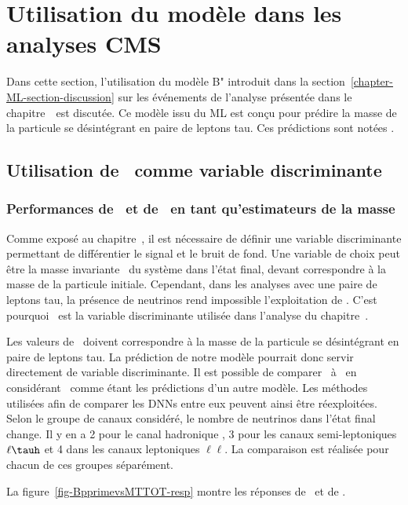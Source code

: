 \section{Utilisation du modèle dans les analyses CMS}\label{chapter-ML-section-use_HTT}
Dans cette section, l'utilisation du modèle B" introduit dans la section~\ref{chapter-ML-section-discussion} sur les événements de l'analyse présentée dans le chapitre~\ est discutée.
Ce modèle issu du ML est conçu pour prédire la masse de la particule se désintégrant en paire de leptons tau.
Ces prédictions sont notées \mml.
\subsection{Utilisation de \mml\ comme variable discriminante}
\subsubsection{Performances de \mml\ et de \mTtot\ en tant qu'estimateurs de la masse}
Comme exposé au chapitre~,
il est nécessaire de définir une variable discriminante
permettant de différentier le signal et le bruit de fond.
Une variable de choix peut être la masse invariante \minv\ du système dans l'état final,
devant correspondre à la masse de la particule initiale.
Cependant, dans les analyses avec une paire de leptons tau,
la présence de neutrinos rend impossible l'exploitation de \minv.
C'est pourquoi
\mTtot\ est la variable discriminante
utilisée dans l'analyse du chapitre~.
\par
Les valeurs de \mml\ doivent correspondre à la masse de la particule se désintégrant en paire de leptons tau.
La prédiction de notre modèle
pourrait donc servir directement de variable discriminante.
Il est possible de comparer \mml\ à \mTtot\ en considérant \mTtot\ comme étant les prédictions d'un autre modèle.
Les méthodes utilisées afin de comparer les DNNs entre eux peuvent ainsi être réexploitées.
Selon le groupe de canaux considéré, le nombre de neutrinos dans l'état final change.
Il y en a
2 pour le canal hadronique \tauh\tauh,
3 pour les canaux semi-leptoniques $\ell\tauh$ et
4 dans les canaux leptoniques $\ell\ell$.
La comparaison est réalisée pour chacun de ces groupes séparément.
\par
La figure~\ref{fig-BpprimevsMTTOT-resp} montre les réponses de \mml\ et de \mTtot.
